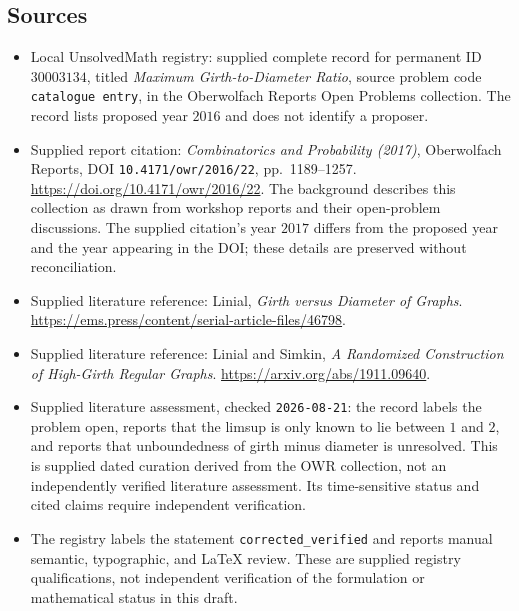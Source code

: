 \documentclass[11pt]{article}
\begin{document}
\subsection{Sources}
\begin{itemize}
\item Local UnsolvedMath registry: supplied complete record for permanent ID \(30003134\), titled \emph{Maximum Girth-to-Diameter Ratio}, source problem code \texttt{catalogue entry}, in the Oberwolfach Reports Open Problems collection. The record lists proposed year \(2016\) and does not identify a proposer.
\item Supplied report citation: \emph{Combinatorics and Probability (2017)}, Oberwolfach Reports, DOI \texttt{10.4171/owr/2016/22}, pp.\ 1189--1257. \url{https://doi.org/10.4171/owr/2016/22}. The background describes this collection as drawn from workshop reports and their open-problem discussions. The supplied citation's year \(2017\) differs from the proposed year and the year appearing in the DOI; these details are preserved without reconciliation.
\item Supplied literature reference: Linial, \emph{Girth versus Diameter of Graphs}. \url{https://ems.press/content/serial-article-files/46798}.
\item Supplied literature reference: Linial and Simkin, \emph{A Randomized Construction of High-Girth Regular Graphs}. \url{https://arxiv.org/abs/1911.09640}.
\item Supplied literature assessment, checked \texttt{2026-08-21}: the record labels the problem open, reports that the limsup is only known to lie between \(1\) and \(2\), and reports that unboundedness of girth minus diameter is unresolved. This is supplied dated curation derived from the OWR collection, not an independently verified literature assessment. Its time-sensitive status and cited claims require independent verification.
\item The registry labels the statement \texttt{corrected\_verified} and reports manual semantic, typographic, and LaTeX review. These are supplied registry qualifications, not independent verification of the formulation or mathematical status in this draft.
\end{itemize}
\end{document}

